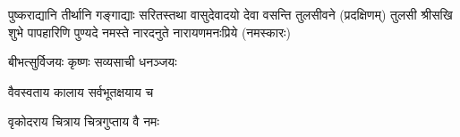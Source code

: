 \twolineshloka
{पुष्कराद्यानि तीर्थानि गङ्गाद्याः सरितस्तथा}
{वासुदेवादयो देवा वसन्ति तुलसीवने}
(प्रदक्षिणम्)
\twolineshloka
{तुलसी श्रीसखि शुभे पापहारिणि पुण्यदे}
{नमस्ते नारदनुते नारायणमनःप्रिये}
 (नमस्कारः)

\closesection


{बीभत्सुर्विजयः कृष्णः सव्यसाची धनञ्जयः}
 
\closesection


{वैवस्वताय   कालाय   सर्वभूतक्षयाय   च}

{वृकोदराय   चित्राय   चित्रगुप्ताय   वै  नमः}
\closesection
